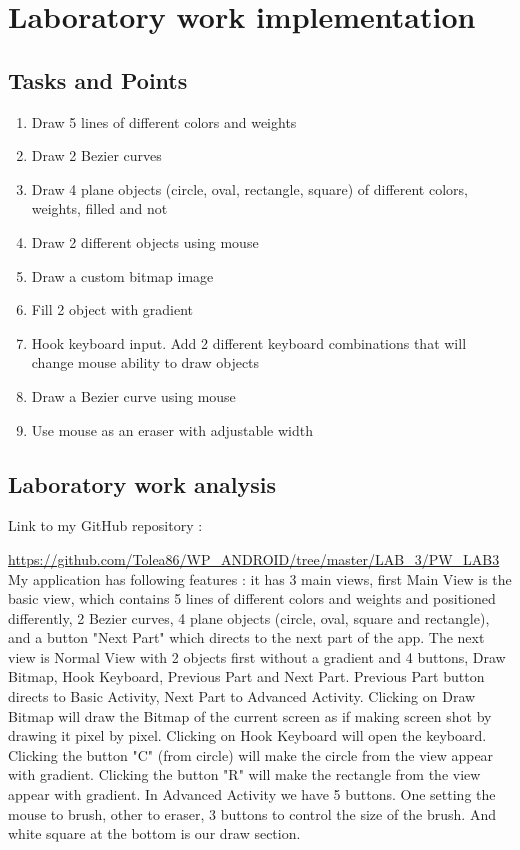 \section{Laboratory work implementation}

\subsection{Tasks and Points}

\begin{enumerate}

\item Draw 5 lines of different colors and weights
\item Draw 2 Bezier curves
\item Draw 4 plane objects (circle, oval, rectangle, square) of different colors, weights, filled and not
\item Draw 2 different objects using mouse
\item Draw a custom bitmap image
\item Fill 2 object with gradient
\item Hook keyboard input. Add 2 different keyboard combinations that will change mouse ability to draw objects
\item Draw a Bezier curve using mouse
\item Use mouse as an eraser with adjustable width

\end{enumerate}
\subsection{Laboratory work analysis}

Link to my GitHub repository : 

\url{https://github.com/Tolea86/WP_ANDROID/tree/master/LAB_3/PW_LAB3}\\

My application has following features : it has 3 main views, first Main View is the basic view, which contains 5 lines of different colors and weights and positioned differently, 2 Bezier curves, 4 plane objects (circle, oval, square and rectangle), and a button "Next Part" which directs to the next part of the app. The next view is Normal View with 2 objects first without a gradient and 4 buttons, Draw Bitmap, Hook Keyboard, Previous Part and Next Part. Previous Part button directs to Basic Activity, Next Part to Advanced Activity. Clicking on Draw Bitmap will draw the Bitmap of the current screen as if making screen shot by drawing it pixel by pixel. Clicking on Hook Keyboard will open the keyboard. Clicking the button "C" (from circle) will make the circle from the view appear with gradient. Clicking the button "R" will make the rectangle from the view appear with gradient. In Advanced Activity we have 5 buttons. One setting the mouse to brush, other to eraser, 3 buttons to control the size of the brush. And white square at the bottom is our draw section.

